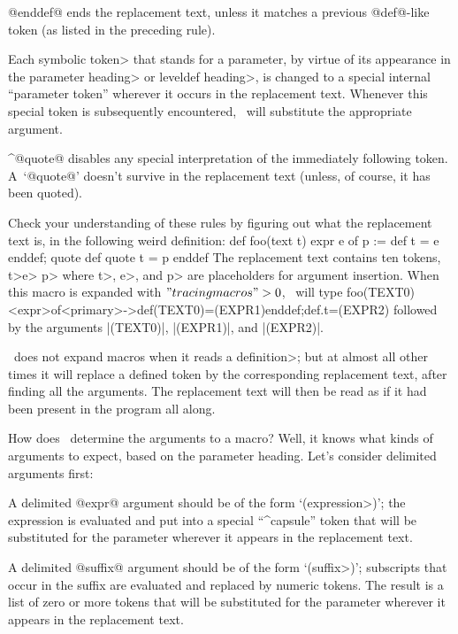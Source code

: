 {{{{\smallskip
\item\bull @enddef@ ends the replacement text, unless it matches a
previous @def@-like token (as listed in the preceding rule).

\smallskip
\item\bull Each \<symbolic token> that stands for a parameter, by
virtue of its appearance in the \<parameter heading> or \<leveldef
heading>, is changed to a special in\-ternal ``parameter
token'' wherever it occurs in the
replacement text. Whenever this special token is subsequently encountered,
\MF\ will substitute the appropriate argument.

\smallskip
\item\bull ^@quote@ disables any special interpretation of the immediately
following token. A~`@quote@' doesn't survive in the replacement text
(unless, of course, it has been quoted).

\dangerexercise Check your understanding of these rules by
figuring out what the replacement text is, in the following weird definition:
\begintt
def foo(text t) expr e of p :=
 def t = e enddef; quote def quote t = p enddef
\endtt
\answer The replacement text contains ten tokens,
\begindisplay
{}\quad\<t>\quad\ttok{=}\quad\<e>\quad{}
\quad\ttok{;}\quad{}\quad{}\quad\ttok{=}\quad\<p>
\enddisplay
where \<t>, \<e>, and \<p> are placeholders for argument insertion.
When this macro is expanded with $"tracingmacros">0$, \MF\ will type
\begintt
foo(TEXT0)<expr>of<primary>->def(TEXT0)=(EXPR1)enddef;def.t=(EXPR2)
\endtt
followed by the arguments |(TEXT0)|, |(EXPR1)|, and |(EXPR2)|.

\danger \MF\ does not expand macros when it reads a \<definition>;
but at almost all other times it will replace a defined token by the
corresponding replacement text, after finding all the arguments.
The replacement text will then be read as if it had been present
in the program all along.

\danger How does \MF\ determine the arguments to a macro? Well,
it knows what kinds of arguments to expect, based on the parameter
heading. Let's consider delimited arguments first:\enddanger\nobreak

\medskip
\item\bull A delimited
@expr@ argument should be of the form `(\<expression>)'; the expression
is evaluated and put into a special ``^{capsule}'' token that will be
substituted for the parameter wherever it appears in the replacement text.

\smallskip
\item\bull A delimited @suffix@ argument should be of the form
`(\<suffix>)'; subscripts that occur in the suffix are evaluated
and replaced by numeric tokens. The result is a list of zero or more
tokens that will be substituted for the parameter wherever it appears
in the replacement text.

}}}}
